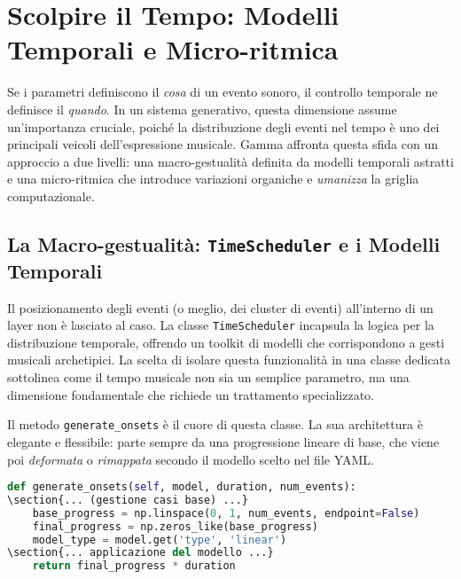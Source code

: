 
\section{Scolpire il Tempo: Modelli Temporali e Micro-ritmica}
Se i parametri definiscono il \textit{cosa} di un evento sonoro, il controllo temporale ne definisce il \textit{quando}. In un sistema generativo, questa dimensione assume un'importanza cruciale, poiché la distribuzione degli eventi nel tempo è uno dei principali veicoli dell'espressione musicale. Gamma affronta questa sfida con un approccio a due livelli: una macro-gestualità definita da modelli temporali astratti e una micro-ritmica che introduce variazioni organiche e \textit{umanizza} la griglia computazionale.
\subsection{La Macro-gestualità: \texttt{TimeScheduler} e i Modelli Temporali}
Il posizionamento degli eventi (o meglio, dei cluster di eventi) all'interno di un layer non è lasciato al caso. La classe \texttt{TimeScheduler} incapsula la logica per la distribuzione temporale, offrendo un toolkit di modelli che corrispondono a gesti musicali archetipici. La scelta di isolare questa funzionalità in una classe dedicata sottolinea come il tempo musicale non sia un semplice parametro, ma una dimensione fondamentale che richiede un trattamento specializzato.

Il metodo \texttt{generate\_onsets} è il cuore di questa classe. La sua architettura è elegante e flessibile: parte sempre da una progressione lineare di base, che viene poi \textit{deformata} o \textit{rimappata} secondo il modello scelto nel file YAML.

\begin{lstlisting}[language=Python]
def generate_onsets(self, model, duration, num_events):
\section{... (gestione casi base) ...}
    base_progress = np.linspace(0, 1, num_events, endpoint=False)
    final_progress = np.zeros_like(base_progress)
    model_type = model.get('type', 'linear')
\section{... applicazione del modello ...}
    return final_progress * duration
\end{lstlisting}


